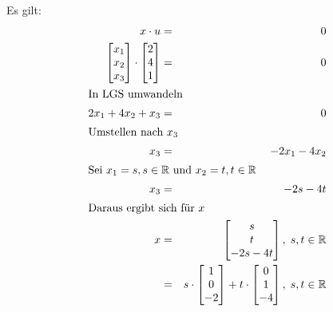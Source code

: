 \documentclass[10pt,a4paper,oneside,ngerman,numbers=noenddot]{scrartcl}
\begin{document}
\subsection{} %
Es gilt:\\
\begin{alignat*}{2}
x \cdot u &=& 0 \\
\begin{bmatrix}
x_{1} \\
x_{2} \\
x_{3}
\end{bmatrix} \cdot
\begin{bmatrix}
2 \\
4 \\
1
\end{bmatrix} &=& 0 \\
\intertext{In LGS umwandeln}
2x_{1} + 4x_{2} + x_{3} &=& 0 \\
\intertext{Umstellen nach $x_{3}$}
x_{3} &=& -2x_{1} - 4x_{2} \\
\intertext{Sei $x_{1} = s, s \in \mathbb{R}$ und $x_{2} = t, t \in \mathbb{R}$}
x_{3} &=& -2s - 4t \\
\intertext{Daraus ergibt sich für $x$}
x &=& \begin{bmatrix}
s \\
t \\
-2s - 4t
\end{bmatrix}, \; s,t \in \mathbb{R} \\
&=& s \cdot \begin{bmatrix}
1 \\
0 \\
-2
\end{bmatrix} + t \cdot 
\begin{bmatrix}
0 \\
1 \\
-4
\end{bmatrix}, \; s,t \in \mathbb{R}
\end{alignat*}
\end{document}
